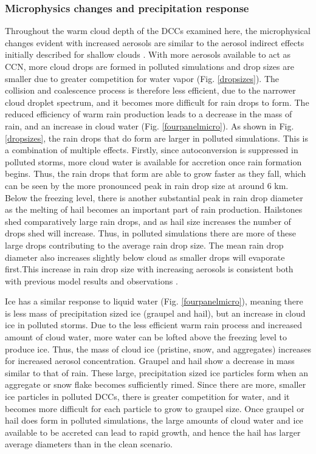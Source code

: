 \subsubsection{Microphysics changes and precipitation response}

Throughout the warm cloud depth of the DCCs examined here, the microphysical changes evident with increased aerosols are similar to the aerosol indirect effects initially described for shallow clouds \citep{Twomey:1977p42,Albrecht:1989p347}.  With more aerosols available to act as CCN, more cloud drops are formed in polluted simulations and drop sizes are smaller due to greater competition for water vapor (Fig. \ref{dropsizes}).  The collision and coalescence process is therefore less efficient, due to the narrower cloud droplet spectrum, and it becomes more difficult for rain drops to form.  The reduced efficiency of warm rain production leads to a decrease in the mass of rain, and an increase in cloud water (Fig. \ref{fourpanelmicro}).  As shown in Fig. \ref{dropsizes}, the rain drops that do form are larger in polluted simulations.  This is a combination of multiple effects.  Firstly, since autoconversion is suppressed in polluted storms, more cloud water is available for accretion once rain formation begins. Thus, the rain drops that form are able to grow faster as they fall, which can be seen by the more pronounced peak in rain drop size at around 6 km. Below the freezing level, there is another substantial peak in rain drop diameter as the melting of hail becomes an important part of rain production. Hailstones shed comparatively large rain drops, and as hail size increases the number of drops shed will increase. Thus, in polluted simulations there are more of these large drops contributing to the average rain drop size. The mean rain drop diameter also increases slightly below cloud as smaller drops will evaporate first.This increase in rain drop size with increasing aerosols is consistent both with previous model results \citep{Altaratz:2007p359,Berg:2008p375,Storer:2010p8001} and observations \citep{May:2011p8538}.  

Ice has a similar response to liquid water (Fig. \ref{fourpanelmicro}), meaning there is less mass of precipitation sized ice (graupel and hail), but an increase in cloud ice in polluted storms.  Due to the less efficient warm rain process and increased amount of cloud water, more water can be lofted above the freezing level to produce ice.  Thus, the mass of cloud ice (pristine, snow, and aggregates) increases for increased aerosol concentration.  Graupel and hail show a decrease in mass similar to that of rain.  These large, precipitation sized ice particles form when an aggregate or snow flake becomes sufficiently rimed.  Since there are more, smaller ice particles in polluted DCCs, there is greater competition for water, and it becomes more difficult for each particle to grow to graupel size.  Once graupel or hail does form in polluted simulations, the large amounts of cloud water and ice available to be accreted can lead to rapid growth, and hence the hail has larger average diameters than in the clean scenario.  

